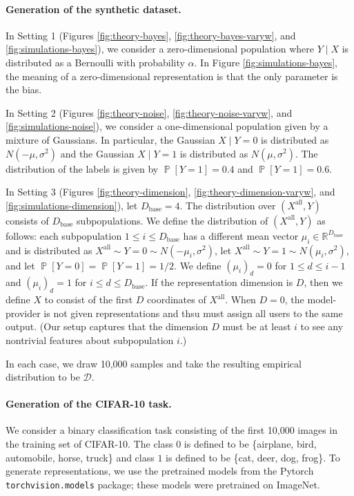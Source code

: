\documentclass[letterpaper,11pt]{article}
\theoremstyle{plain}
\DeclareMathOperator*{\Prob}{\mathbb{P}}
\begin{document}
\paragraph{Generation of the synthetic dataset.}
In Setting 1 (Figures \ref{fig:theory-bayes}, \ref{fig:theory-bayes-varyw}, and \ref{fig:simulations-bayes}), we consider a zero-dimensional population where $Y \mid X$ is distributed as a Bernoulli with probability $\alpha$. In Figure \ref{fig:simulations-bayes}, the meaning of a zero-dimensional representation is that the only parameter is the bias. 

In Setting 2 (Figures \ref{fig:theory-noise}, \ref{fig:theory-noise-varyw}, and \ref{fig:simulations-noise}), we consider a one-dimensional population given by a mixture of Gaussians. In particular, the Gaussian $X \mid Y = 0$ is distributed as $N(-\mu, \sigma^2)$ and the Gaussian $X \mid Y = 1$ is distributed as $N(\mu, \sigma^2)$. The distribution of the labels is given by $\Prob[Y = 1] = 0.4$ and $\Prob[Y = 1] = 0.6$. 

In Setting 3 (Figures \ref{fig:theory-dimension}, \ref{fig:theory-dimension-varyw}, and \ref{fig:simulations-dimension}),  let $D_{\text{base}} = 4$. The distribution over $(X^{\text{all}}, Y)$ consists of $D_{\text{base}}$ subpopulations. We define the distribution of $(X^{\text{all}}, Y)$ as follows: each subpopulation $1 \le i \le D_{\text{base}}$ has a different mean vector $\mu_i \in \mathbb{R}^{D_{\text{base}}}$ and is distributed as $X^{\text{all}} \sim Y = 0 \sim N(-\mu_i, \sigma^2)$, let $X^{\text{all}} \sim Y = 1 \sim N(\mu_i, \sigma^2)$, and let $\Prob[Y = 0] = \Prob[Y = 1] = 1/2$. We define $(\mu_i)_d = 0$ for $1 \le d \le i-1$ and $(\mu_i)_d = 1$ for $i \le d \le D_{\text{base}}$. If the representation dimension is $D$, then we define $X$ to consist of the first $D$ coordinates of $X^{\text{all}}$. When $D = 0$, the model-provider is not given representations and thsu must assign all users to the same output. (Our setup captures that the dimension $D$ must be at least $i$ to see any nontrivial features about subpopulation $i$.)

In each case, we draw 10,000 samples and take the resulting empirical distribution to be $\mathcal{D}$. 


\paragraph{Generation of the CIFAR-10 task.}
We consider a binary classification task consisting of the first 10,000 images in the training set of CIFAR-10. The class $0$ is defined to be  \{airplane, bird, automobile, horse, truck\} and class $1$ is defined to be \{cat, deer, dog, frog\}. To generate representations, we use the pretrained models from the Pytorch \texttt{torchvision.models} package; these models were pretrained on ImageNet. 
\end{document}
